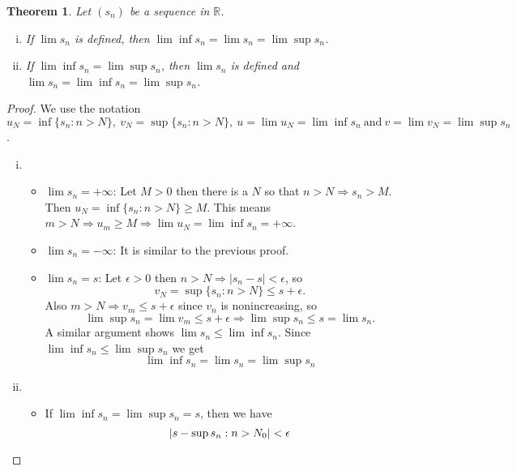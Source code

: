 \documentclass[12pt, lettersize]{book}
\theoremstyle{plain}
\newtheorem{thm}{Theorem}[section]
\theoremstyle{definition}
\theoremstyle{remark}
\begin{document}
		\begin{thm}\label{def:condition for limit}
		Let $(s_n)$ be a sequence in $\mathbb{R}$.
		\begin{enumerate}[(i)]
			\item If $\lim s_n$ is defined, then $\lim\inf s_n=\lim s_n=\lim\sup s_n$.
			\item If $\lim\inf s_n=\lim\sup s_n$, then $\lim s_n$ is defined and $\lim s_n=\lim\inf s_n=\lim\sup s_n$.
		\end{enumerate}
		\end{thm}
		\begin{proof}
		We use the notation $u_N=\inf\{s_n: n>N\},\ v_N=\sup \{s_n: n>N\},\ u=\lim u_N=\lim\inf s_n\ \text{and}\ v=\lim v_N=\lim\sup s_n$.
		\begin{enumerate}[(i)]
			\item \begin{itemize}
					  \item $\lim s_n=+\infty$: Let $M>0$ then there is a $N$ so that $n>N\Rightarrow s_n>M$. Then
					  $u_N=\inf\{s_n: n>N\}\geq M$. This means $m>N\Rightarrow u_m\geq M\Rightarrow\lim u_N=\lim\inf s_n=+\infty$.
					  \item $\lim s_n=-\infty$: It is similar to the previous proof.
					  \item $\lim s_n=s$: Let $\epsilon>0$ then $n>N\Rightarrow |s_n-s|<\epsilon$, so
					  \begin{displaymath}
					  	v_N=\sup\{s_n: n>N\}\leq s+\epsilon.
					  \end{displaymath}
				  	  Also $m>N\Rightarrow v_m\leq s+\epsilon$ since $v_n$ is nonincreasing, so 
				  	  \begin{displaymath}
				  	  	\lim\sup s_n=\lim v_m\leq s+\epsilon\Rightarrow\lim\sup s_n\leq s=\lim s_n.
				  	  \end{displaymath}
			  	  	  A similar argument shows $\lim s_n\leq\lim\inf s_n$. Since $\lim\inf s_n\leq\lim\sup s_n$ we get
			  	  	  \begin{displaymath}
			  	  	  	\lim\inf s_n=\lim s_n=\lim\sup s_n
			  	  	  \end{displaymath}
				  \end{itemize}
			\item \begin{itemize}
					  \item If $\lim\inf s_n=\lim\sup s_n=s$, then we have
					  \begin{displaymath}
					  	\abs{s-\sup{s_n:n>N_0}}<\epsilon
					  \end{displaymath}

\end{itemize}
\end{enumerate}
\end{proof}
\end{document}
